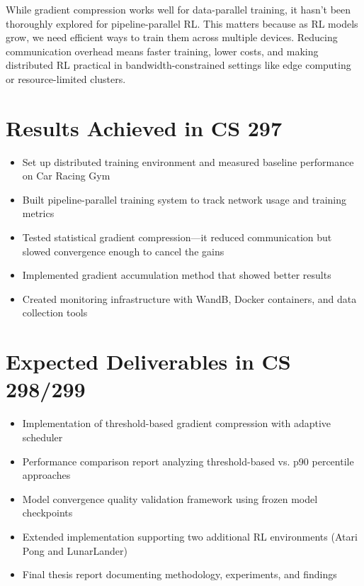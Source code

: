 \documentclass[11pt,onecolumn]{sjsucs-proposal}
\begin{document}
While gradient compression works well for data-parallel training, it hasn't been thoroughly explored for pipeline-parallel RL. This matters because as RL models grow, we need efficient ways to train them across multiple devices. Reducing communication overhead means faster training, lower costs, and making distributed RL practical in bandwidth-constrained settings like edge computing or resource-limited clusters.

\section{Results Achieved in CS 297}
\begin{itemize}
  \item Set up distributed training environment and measured baseline performance on Car Racing Gym
  \item Built pipeline-parallel training system to track network usage and training metrics
  \item Tested statistical gradient compression—it reduced communication but slowed convergence enough to cancel the gains
  \item Implemented gradient accumulation method that showed better results
  \item Created monitoring infrastructure with WandB, Docker containers, and data collection tools
\end{itemize}


\section{Expected Deliverables in CS 298/299}
\begin{itemize}
  \item Implementation of threshold-based gradient compression with adaptive scheduler
  \item Performance comparison report analyzing threshold-based vs. p90 percentile approaches
  \item Model convergence quality validation framework using frozen model checkpoints
  \item Extended implementation supporting two additional RL environments (Atari Pong and LunarLander)
  \item Final thesis report documenting methodology, experiments, and findings
\end{itemize}
\end{document}

